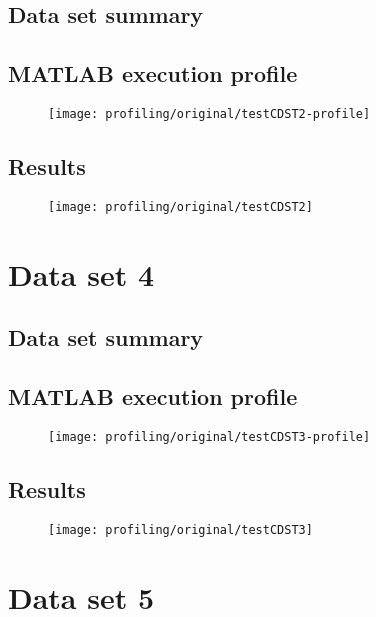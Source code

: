 \subsection{Data set summary}

\subsection{MATLAB execution profile}
\begin{figure}[H]
	\centering
	\texttt{[image: profiling/original/testCDST2-profile]}
\end{figure}

\subsection{Results}
\begin{figure}[H]
	\centering
	\texttt{[image: profiling/original/testCDST2]}
\end{figure}

\section{Data set 4}

\subsection{Data set summary}

\subsection{MATLAB execution profile}
\begin{figure}[H]
	\centering
	\texttt{[image: profiling/original/testCDST3-profile]}
\end{figure}

\subsection{Results}
\begin{figure}[H]
	\centering
	\texttt{[image: profiling/original/testCDST3]}
\end{figure}

\section{Data set 5}

